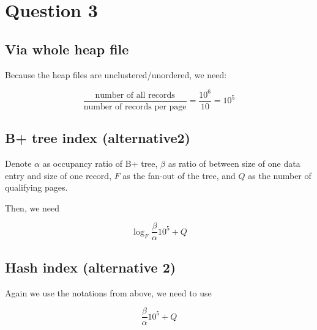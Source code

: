 \section{Question 3}\label{question-3}

\subsection{Via whole heap file}\label{via-whole-heap-file}

Because the heap files are unclustered/unordered, we need:

\[
  \frac{\text{number of all records}}{\text{number of records per page}} = \frac{10^6}{10} = 10^5
\]

\subsection{B+ tree index (alternative2)}\label{b-tree-index-alternative-2}

Denote
$\alpha$ as occupancy ratio of B+ tree,
$\beta$ as ratio of between size of one data entry and size of one record,
$F$ as the fan-out of the tree,
and $Q$ as the number of qualifying pages.

Then, we need

\[
  \log_F \frac{\beta}{\alpha} 10^5 + Q
\]

\subsection{Hash index (alternative 2)}\label{hash-index-alternative-2}

Again we use the notations from above, we need to use

\[
  \frac{\beta}{\alpha} 10^5 + Q
\]
